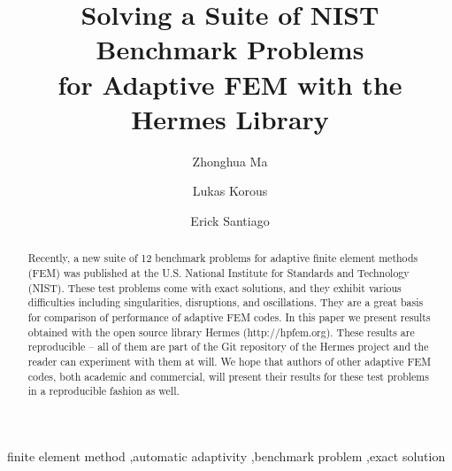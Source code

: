 \documentclass[12pt]{elsarticle}
\begin{document}
\begin{frontmatter}



\title{Solving a Suite of NIST Benchmark Problems\\ for Adaptive FEM with the Hermes Library}

\author[label1]{Zhonghua Ma}
\author[label2]{Lukas Korous}
\author[label3]{Erick Santiago}
\address[label1]{China University of Petroleum, Beijing, China}
\address[label2]{Charles University, Prague, Czech Republic}
\address[label3]{University of Nevada, Reno, USA}

\begin{abstract}
Recently, a new suite of 12 benchmark problems for adaptive finite element methods (FEM)
was published at the U.S. National Institute for Standards and Technology (NIST).
These test problems come with exact solutions, and they exhibit various difficulties 
including singularities, disruptions, and oscillations. They are a great basis for comparison 
of performance of adaptive FEM codes. In this paper we present results obtained
with the open source library Hermes (http://hpfem.org). These results are reproducible --
all of them are part of the Git repository of the Hermes project and the reader can experiment 
with them at will. We hope that authors of other adaptive FEM codes, both academic and 
commercial, will present their results for these test problems in a reproducible fashion as well. 
\end{abstract}

\begin{keyword}
finite element method \sep automatic adaptivity \sep benchmark problem \sep exact solution
\end{keyword}

\end{frontmatter}
\end{document}
